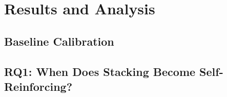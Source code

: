 \chapter{Results and Analysis}
\label{ch:results}

%

\section{Baseline Calibration}
\label{sec:results-baseline}


\section{RQ1: When Does Stacking Become Self-Reinforcing?}
\label{sec:results-rq1}


